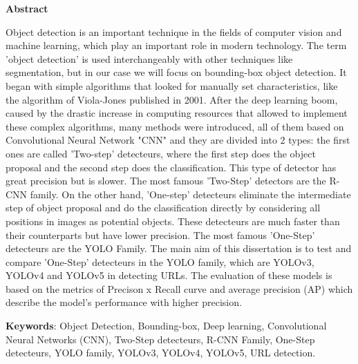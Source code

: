 \newpage
\thispagestyle{empty}
\begin{center}
{\Large \textbf{Abstract}}
\end{center}
Object detection is an important technique in the fields of computer vision and machine learning, which play an important role in modern technology.
The term 'object detection' is used interchangeably with other techniques like segmentation, but in our case we will focus on bounding-box object detection.
It began with simple algorithms that looked for manually set characteristics, like the algorithm of Viola-Jones published in 2001. After the deep learning boom, caused by the drastic increase in computing resources that allowed to implement these complex algorithms, many methods were introduced, all of them based on Convolutional Neural Network "CNN" and they are divided into 2 types:
the first ones are called 'Two-step' detecteurs, where the first step does the object proposal and the second step does the classification. This type of detector has great precision but is slower. The most famous 'Two-Step' detectors are the R-CNN family. 
On the other hand, 'One-step' detecteurs eliminate the intermediate step of object proposal and do the classification directly by considering all positions in images as potential objects. These detecteurs are much faster than their counterparts but have lower precision. The most famous 'One-Step' detecteurs are the YOLO Family. 
The main aim of this dissertation is to test and compare 'One-Step' detecteurs in the YOLO family, which are YOLOv3, YOLOv4 and YOLOv5 in detecting URLs. 
The evaluation of these models is based on the metrics of Precison x Recall curve and average precision (AP) which describe the model's performance with higher precision. 

\vspace{1cm}
\textbf{Keywords}: Object Detection, Bounding-box, Deep learning, Convolutional Neural Networks (CNN), Two-Step detecteurs, R-CNN Family, One-Step detecteurs, YOLO family, YOLOv3, YOLOv4, YOLOv5, URL detection.


